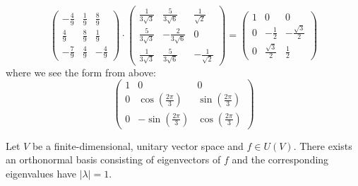 \begin{example}
\[      \begin{pmatrix}
         -\frac{4}{9} & \frac{1}{9} & \frac{8}{9}\\
         \frac{4}{9} & \frac{8}{9} & \frac{1}{9}\\
         -\frac{7}{9} & \frac{4}{9} & -\frac{4}{9}
      \end{pmatrix} \cdot
      \begin{pmatrix}
         \frac{1}{3\sqrt{3}} & \frac{5}{3\sqrt{6}} & \frac{1}{\sqrt{2}}\\
         \frac{5}{3\sqrt{3}} & -\frac{2}{3\sqrt{6}} & 0\\
         \frac{1}{3\sqrt{3}} & \frac{5}{3\sqrt{6}} & -\frac{1}{\sqrt{2}}
      \end{pmatrix} =
      \begin{pmatrix}
         1 & 0 & 0\\
         0 & -\frac{1}{2} & -\frac{\sqrt{3}}{2}\\
         0 & \frac{\sqrt{3}}{2} & \frac{1}{2}
      \end{pmatrix}
   \]
   where we see the form from above:
   \[
      \begin{pmatrix}
         1 & 0 & 0\\
         0 & \cos\left(\frac{2\pi}{3}\right) & \sin\left(\frac{2\pi}{3}\right) \\
         0 & -\sin\left(\frac{2\pi}{3}\right) & \cos\left(\frac{2\pi}{3}\right)
      \end{pmatrix}
   \]
\end{example}

\begin{proposition}\label{pro:eigenbasis}
   Let \(V\) be a finite-dimensional, unitary vector space and \(f \in U(V)\).
   There exists an orthonormal basis consisting of eigenvectors of \(f\) and the corresponding eigenvalues have \(|\lambda| = 1\).
\end{proposition}

